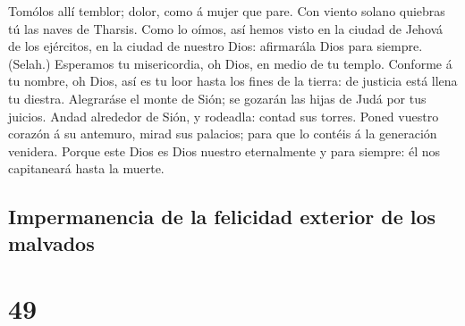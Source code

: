  Tomólos allí temblor; dolor, como á mujer que pare.
 Con viento solano quiebras tú las naves de Tharsis.
 Como lo oímos, así hemos visto en la ciudad de Jehová de
los ejércitos, en la ciudad de nuestro Dios: afirmarála Dios para
siempre. (Selah.)  Esperamos tu misericordia, oh Dios, en
medio de tu templo.  Conforme á tu nombre, oh Dios, así es
tu loor hasta los fines de la tierra: de justicia está llena tu diestra.
 Alegraráse el monte de Sión; se gozarán las hijas de Judá
por tus juicios.  Andad alrededor de Sión, y rodeadla:
contad sus torres.  Poned vuestro corazón á su antemuro,
mirad sus palacios; para que lo contéis á la generación venidera.
 Porque este Dios es Dios nuestro eternalmente y para
siempre: él nos capitaneará hasta la muerte.

\hypertarget{impermanencia-de-la-felicidad-exterior-de-los-malvados}{%
\subsection{Impermanencia de la felicidad exterior de los
malvados}\label{impermanencia-de-la-felicidad-exterior-de-los-malvados}}

\hypertarget{section-48}{%
\section{49}\label{section-48}}

